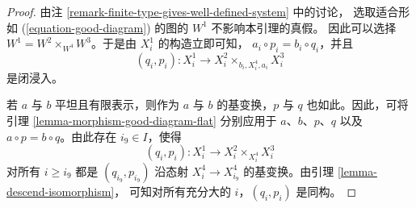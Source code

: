 \begin{proof}
由注 \ref{remark-finite-type-gives-well-defined-system} 中的讨论，
选取适合形如 (\ref{equation-good-diagram}) 的图的 $W^1$ 不影响本引理的真假。
因此可以选择 $W^1 = W^2 \times_{W^4} W^3$。于是由 $X^1_i$ 的构造立即可知，
$a_i \circ p_i = b_i \circ q_i$，并且
$$
(q_i, p_i) : X^1_i \longrightarrow X^2_i \times_{b_i, X^4_i, a_i} X^3_i
$$
是闭浸入。

\medskip\noindent
若 $a$ 与 $b$ 平坦且有限表示，则作为 $a$ 与 $b$ 的基变换，$p$ 与 $q$
也如此。因此，可将引理 \ref{lemma-morphism-good-diagram-flat} 分别应用于
$a$、$b$、$p$、$q$ 以及 $a \circ p = b \circ q$。由此存在
$i_9 \in I$，使得 %
$$
(q_i, p_i) : X^1_i \to X^2_i \times_{X^4_i} X^3_i
$$
对所有 $i \geq i_9$ 都是 $(q_{i_9}, p_{i_9})$ 沿态射 %
$X^4_i \to X^4_{i_9}$ 的基变换。由引理 \ref{lemma-descend-isomorphism}，
可知对所有充分大的 $i$，$(q_i, p_i)$ 是同构。
\end{proof}


















